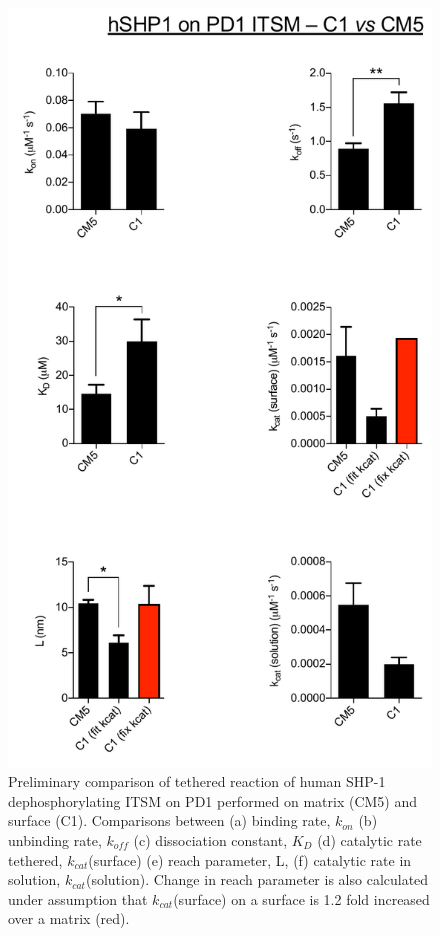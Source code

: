 \documentclass[../../AdvancementSummary.tex]{subfiles}
\begin{document}
\begin{figure}[h]
	\begin{center}
		\includegraphics[scale=0.5]{ResultsFigures/ExperimentalDataPlots/hSHP1_on_PD1_ITSM_CM5_vs_C1.pdf}
	\end{center}
	\caption{Preliminary comparison of tethered reaction of human SHP-1 dephosphorylating ITSM on PD1 performed on matrix (CM5) and surface (C1). Comparisons between (a) binding rate, $k_{on}$ (b) unbinding rate, $k_{off}$ (c) dissociation constant, $K_D$ (d) catalytic rate tethered, $k_{cat}$(surface) (e) reach parameter, L, (f) catalytic rate in solution, $k_{cat}$(solution). Change in reach parameter is also calculated under assumption that $k_{cat}$(surface) on a surface is 1.2 fold increased over a matrix (red). \label{fig: PD1Data}}
\end{figure}
\end{document}
